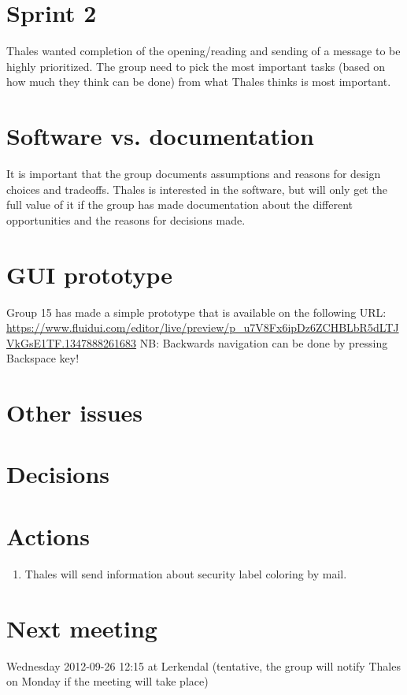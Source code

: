 \documentclass[a4paper,12pt]{article}
\begin{document}
\section{Sprint 2}
Thales wanted completion of the opening/reading and sending of a message to be highly prioritized. 
The group need to pick the most important tasks (based on how much they think can be done) from what Thales thinks is most important. 
\section{Software vs. documentation}
It is important that the group documents assumptions and reasons for design choices and tradeoffs. 
Thales is interested in the software, but will only get the full value of it if the group has made documentation about
the different opportunities and the reasons for decisions made.
\section{GUI prototype}
Group 15 has made a simple prototype that is available on the following URL:
\url{https://www.fluidui.com/editor/live/preview/p_u7V8Fx6ipDz6ZCHBLbR5dLTJVkGsE1TF.1347888261683}
\newline
NB: Backwards navigation can be done by pressing Backspace key!
\section{Other issues}
\section{Decisions}
\section{Actions}
\begin{enumerate}
\item
Thales will send information about security label coloring by mail.
\end{enumerate}
\section{Next meeting}
Wednesday 2012-09-26 12:15 at Lerkendal (tentative, the group will notify Thales on Monday if the meeting will take place)
\end{document}
